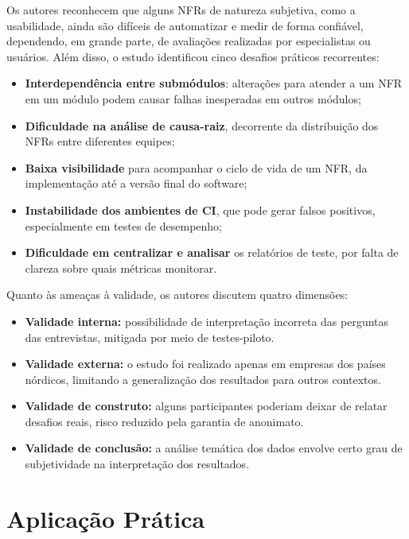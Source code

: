 \documentclass[12pt]{article}
\begin{document}
Os autores reconhecem que alguns NFRs de natureza subjetiva, como a usabilidade, ainda são difíceis de automatizar e medir de forma confiável, dependendo, em grande parte, de avaliações realizadas por especialistas ou usuários. Além disso, o estudo identificou cinco desafios práticos recorrentes:

\begin{itemize}
    \item \textbf{Interdependência entre submódulos}: alterações para atender a um NFR em um módulo podem causar falhas inesperadas em outros módulos;
    \item \textbf{Dificuldade na análise de causa-raiz}, decorrente da distribuição dos NFRs entre diferentes equipes;
    \item \textbf{Baixa visibilidade} para acompanhar o ciclo de vida de um NFR, da implementação até a versão final do software;
    \item \textbf{Instabilidade dos ambientes de CI}, que pode gerar falsos positivos, especialmente em testes de desempenho;
    \item \textbf{Dificuldade em centralizar e analisar} os relatórios de teste, por falta de clareza sobre quais métricas monitorar.
\end{itemize}

Quanto às ameaças à validade, os autores discutem quatro dimensões:

\begin{itemize}
    \item \textbf{Validade interna:} possibilidade de interpretação incorreta das perguntas das entrevistas, mitigada por meio de testes-piloto.

    \item \textbf{Validade externa:} o estudo foi realizado apenas em empresas dos países nórdicos, limitando a generalização dos resultados para outros contextos.

    \item \textbf{Validade de construto:} alguns participantes poderiam deixar de relatar desafios reais, risco reduzido pela garantia de anonimato.

    \item \textbf{Validade de conclusão:} a análise temática dos dados envolve certo grau de subjetividade na interpretação dos resultados.
\end{itemize}

\section{Aplicação Prática}
\end{document}
